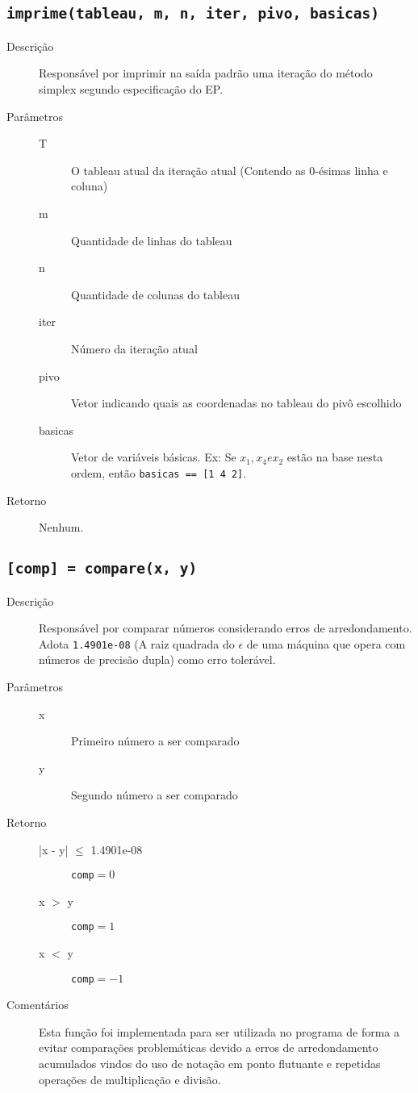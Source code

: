 \documentclass[brazil,times]{abnt}
\begin{document}
\subsection*{\texttt{imprime(tableau, m, n, iter, pivo, basicas)}}
\begin{description}
	\item[Descrição] Responsável por imprimir na saída padrão uma iteração do método simplex segundo especificação do EP.
	\item[Parâmetros] 
		\begin{description}
		 \item[T] O tableau atual da iteração atual (Contendo as 0-ésimas linha e coluna)
		 \item[m] Quantidade de linhas do tableau
		 \item[n] Quantidade de colunas do tableau
		 \item[iter] Número da iteração atual
		 \item[pivo] Vetor indicando quais as coordenadas no tableau do pivô escolhido
		 \item[basicas] Vetor de variáveis básicas. Ex: Se $x_1, x_4 e x_2$ estão na base nesta ordem, então \texttt{basicas == [1 4 2]}.
		\end{description}
	\item[Retorno] Nenhum.
\end{description}

\subsection*{\texttt{[comp] = compare(x, y)}}
\begin{description}
	\item[Descrição] Responsável por comparar números considerando erros de arredondamento. Adota \texttt{1.4901e-08} (A raiz quadrada do $\epsilon$ de uma máquina que opera com números de precisão dupla) como erro tolerável.
	\item[Parâmetros] 
		\begin{description}
		 \item[x] Primeiro número a ser comparado
		 \item[y] Segundo número a ser comparado
		\end{description}
	\item[Retorno]
		\begin{description}
		 \item[|x - y| $\leq$ 1.4901e-08] \texttt{comp}$ = 0$
		 \item[x $>$ y] \texttt{comp}$ = 1$
		 \item[x $<$ y] \texttt{comp}$ = -1$
		\end{description}
	\item[Comentários] Esta função foi implementada para ser utilizada no programa de forma a evitar comparações problemáticas devido a erros de arredondamento acumulados vindos do uso de notação em ponto flutuante e repetidas operações de multiplicação e divisão.
\end{description}
\end{document}
